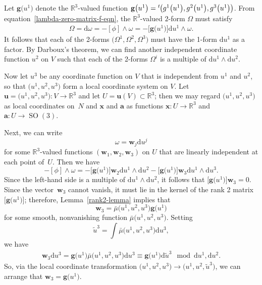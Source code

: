 \documentclass[pdftex]{sigma}
\numberwithin{equation}{section}
\renewcommand{\d}{\mathrm{d}}%
\newcommand{\bbR}{{\mathbb R}}
\newcommand{\SO}{\operatorname{SO}}
\newcommand{\mba}{\mathbf{a}}
\newcommand{\mbg}{\mathbf{g}}
\newcommand{\mbu}{\mathbf{u}}
\newcommand{\mbw}{\mathbf{w}}
\newcommand{\mbx}{\mathbf{x}}
\begin{document}
Let $\mbg\big(u^1\big)$ denote the $\bbR^3$-valued function $\mbg\big(u^1\big) = {}^t\hskip-1pt\big(g^1\big(u^1\big), g^2\big(u^1\big), g^3\big(u^1\big)\big)$. From equa\-tion~\eqref{lambda-zero-matrix-f-eqn}, the $\bbR^3$-valued $2$-form $\Omega$ must satisfy
\begin{gather}\label{invariant-Omega}
 \Omega = \d\omega = -[\phi] \wedge \omega = -\big[\mbg\big(u^1\big)\big] \d u^1 \wedge \omega.
\end{gather}
It follows that each of the 2-forms $\big(\Omega^1, \Omega^2, \Omega^3\big)$ must have the 1-form $\d u^1$ as a factor. By Darboux's theorem, we can find another independent coordinate function $u^2$ on $V$ such that each of the 2-forms $\Omega^i$ is a multiple of $\d u^1 \wedge \d u^2$.

Now let $u^3$ be any coordinate function on $V$ that is independent from $u^1$ and $u^2$, so that $\big(u^1, u^2, u^3\big)$ form a local coordinate system on $V$. Let $\mbu = \big(u^1, u^2, u^3\big)\colon V \to \bbR^3$ and let $U = \mbu(V) \subset \bbR^3$; then we may regard $\big(u^1, u^2, u^3\big)$ as local coordinates on~$N$ and $\mbx$ and $\mba$ as functions $\mbx\colon U \to \bbR^3$ and $\mba\colon U \to \SO(3)$.

Next, we can write
\[ \omega = \mbw_j \d u^j \]
for some $\bbR^3$-valued functions $(\mbw_1, \mbw_2, \mbw_3)$ on $U$ that are linearly independent at each point of~$U$. Then we have
\[ -[\phi] \wedge \omega = -\big[\mbg\big(u^1\big)\big] \mbw_2 \d u^1 \wedge \d u^2 -
\big[\mbg\big(u^1\big)\big] \mbw_3 \d u^1 \wedge \d u^3. \]
Since the left-hand side is a multiple of $\d u^1 \wedge \d u^2$, it follows that $\big[\mbg\big(u^1\big)\big] \mbw_3 = 0$. Since the vector~$\mbw_3$ cannot vanish, it must lie in the kernel of the rank 2 matrix $\big[\mbg\big(u^1\big)\big]$; therefore, Lemma~\ref{rank2-lemma} implies that
\[ \mbw_3 = \bar{\mu}\big(u^1, u^2, u^3\big) \mbg\big(u^1\big) \]
for some smooth, nonvanishing function $\bar{\mu}\big(u^1, u^2, u^3\big)$.
Setting
\[ \tilde{u}^3 = \int \bar{\mu}\big(u^1, u^2, u^3\big) \d u^3, \]
we have
\begin{gather*}
\mbw_3 \d u^3 = \mbg\big(u^1\big) \bar{\mu}\big(u^1, u^2, u^3\big) \d u^3
 \equiv \mbg\big(u^1\big) \d \tilde{u}^3 \mod{\d u^1, \d u^2}.
\end{gather*}
So, via the local coordinate transformation $\big(u^1, u^2, u^3\big) \to \big(u^1, u^2, \tilde{u}^3\big)$, we can arrange that $\mbw_3 = \mbg\big(u^1\big)$.
\end{document}
